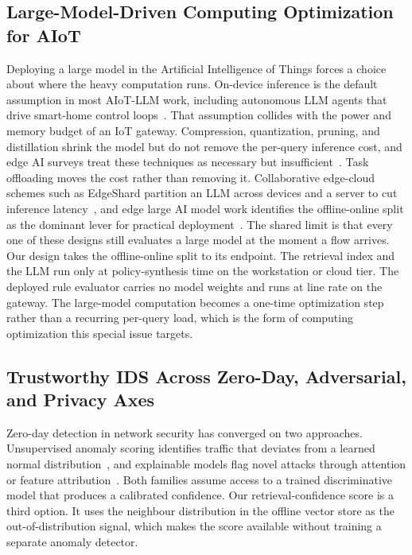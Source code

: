 \subsection{Large-Model-Driven Computing Optimization for AIoT}
\label{subsec:rw_compute_opt}

Deploying a large model in the Artificial Intelligence of Things forces a
choice about where the heavy computation runs. On-device inference is the
default assumption in most AIoT-LLM work, including autonomous LLM agents
that drive smart-home control loops~\cite{rivkin2025aiotsmarthome}. That
assumption collides with the power and memory budget of an IoT gateway.
Compression, quantization, pruning, and distillation shrink the model but
do not remove the per-query inference cost, and edge AI surveys treat
these techniques as necessary but
insufficient~\cite{deploying2025edgeai}. Task offloading moves the cost
rather than removing it. Collaborative edge-cloud schemes such as
EdgeShard partition an LLM across devices and a server to cut inference
latency~\cite{zhang2025edgeshard}, and edge large AI model work
identifies the offline-online split as the dominant lever for practical
deployment~\cite{wang2025edgelam,frontiers2025edgellm}. The shared limit
is that every one of these designs still evaluates a large model at the
moment a flow arrives. Our design takes the offline-online split to its
endpoint. The retrieval index and the LLM run only at policy-synthesis
time on the workstation or cloud tier. The deployed rule evaluator carries
no model weights and runs at line rate on the gateway. The large-model
computation becomes a one-time optimization step rather than a recurring
per-query load, which is the form of computing optimization this special
issue targets.

\subsection{Trustworthy IDS Across Zero-Day, Adversarial, and Privacy Axes}
\label{subsec:rw_trust}

Zero-day detection in network security has converged on two approaches.
Unsupervised anomaly scoring identifies traffic that deviates from a
learned normal distribution~\cite{guo2023zerodaysurvey,sarhan2023zeroshot},
and explainable models flag novel attacks through attention or feature
attribution~\cite{discoveriot2025zeroday_xai,kasongo2025attnzeroday}. Both
families assume access to a trained discriminative model that produces a
calibrated confidence. Our retrieval-confidence score is a third option.
It uses the neighbour distribution in the offline vector store as the
out-of-distribution signal, which makes the score available without
training a separate anomaly detector.

